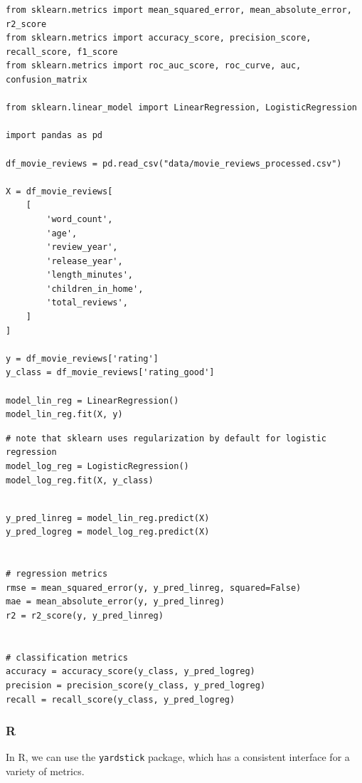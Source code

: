 \documentclass[
  letterpaper,
]{krantz}
\begin{document}
\begin{verbatim}
from sklearn.metrics import mean_squared_error, mean_absolute_error, r2_score
from sklearn.metrics import accuracy_score, precision_score, recall_score, f1_score
from sklearn.metrics import roc_auc_score, roc_curve, auc, confusion_matrix

from sklearn.linear_model import LinearRegression, LogisticRegression

import pandas as pd

df_movie_reviews = pd.read_csv("data/movie_reviews_processed.csv")

X = df_movie_reviews[
    [
        'word_count',
        'age',
        'review_year',
        'release_year',
        'length_minutes',
        'children_in_home',
        'total_reviews',
    ]
]

y = df_movie_reviews['rating']
y_class = df_movie_reviews['rating_good']

model_lin_reg = LinearRegression()
model_lin_reg.fit(X, y)
\end{verbatim}

\begin{verbatim}
# note that sklearn uses regularization by default for logistic regression
model_log_reg = LogisticRegression() 
model_log_reg.fit(X, y_class)
\end{verbatim}

\begin{verbatim}

y_pred_linreg = model_lin_reg.predict(X)
y_pred_logreg = model_log_reg.predict(X)


# regression metrics
rmse = mean_squared_error(y, y_pred_linreg, squared=False)
mae = mean_absolute_error(y, y_pred_linreg)
r2 = r2_score(y, y_pred_linreg)


# classification metrics
accuracy = accuracy_score(y_class, y_pred_logreg)
precision = precision_score(y_class, y_pred_logreg)
recall = recall_score(y_class, y_pred_logreg)
\end{verbatim}

\subsubsection{R}

In R, we can use the \texttt{yardstick} package, which has a consistent
interface for a variety of metrics.
\end{document}
